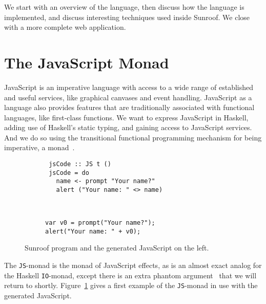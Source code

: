 \documentclass{llncs}
\newcommand{\Src}[1]{{\tt{#1}}}
\newcommand{\IO}{\Src{IO}}
\newcommand{\JS}{\Src{JS}}
\begin{document}
We start with an overview of the language, then discuss
how the language is implemented, and discuss interesting
techniques used inside Sunroof. We close with a more
complete web application.

\section{The JavaScript Monad}

JavaScript is an imperative language with access to a wide range
of established and useful services, like graphical canvases and event
handling. JavaScript as a language also provides features that are
traditionally associated with functional languages, like first-class 
functions. We want to express JavaScript in Haskell, adding use
of Haskell's static typing, and gaining access to JavaScript services.
And we do so using the transitional functional programming 
mechanism for being imperative, a monad~\cite{Moggi:91:ComputationMonads}.

\begin{figure}[h]
\vspace{-0.5cm}
\centering
\begin{subfigure}{0.45\textwidth}%
\begin{verbatim}
 jsCode :: JS t ()
 jsCode = do
   name <- prompt "Your name?"
   alert ("Your name: " <> name)
\end{verbatim}%
\end{subfigure}%
\hfill%
\begin{subfigure}{0.45\textwidth}
\vspace{0.25cm}%
\begin{verbatim}
  
  
var v0 = prompt("Your name?"); 
alert("Your name: " + v0);
\end{verbatim}%
\end{subfigure}%
\caption{Sunroof program and the generated JavaScript on the left.}%
\label{fig:code-example}%
\vspace{-0.5cm}
\end{figure}

The \JS-monad is the monad of JavaScript effects, as is an almost
exact analog for the Haskell \IO-monad, except there
is an extra phantom argument~\cite{Leijen:99:Phantom} that we will return
to shortly.  Figure~\ref{fig:code-example} gives a first example
of the \JS-monad in use with the generated JavaScript.
\end{document}

